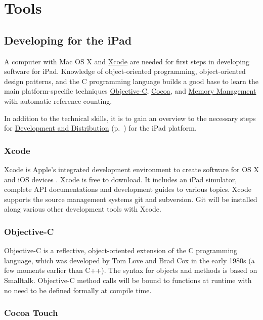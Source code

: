 

\section{Tools}

\subsection{Developing for the iPad}

A computer with Mac OS X and 
\href{sec:Xcode}{Xcode} are needed for first steps in developing software for iPad. 
Knowledge of object-oriented programming, object-oriented design patterns, 
and the C programming language 
builds a good base to learn the main platform-specific techniques 
\href{sec:ObjC}{Objective-C},
\href{sec:Cocoa}{Cocoa}, and
\href{sec:MemoryManagement}{Memory Management}
with automatic reference counting.

In addition to the technical skills, it is to gain an overview to the necessary steps for 
\href{sec:DAD}{Development and Distribution} (p.~\pageref{sec:DAD}) for the iPad platform.

\subsubsection{Xcode}
\label{sec:Xcode}

Xcode is Apple's integrated development environment to create software for OS X and iOS devices 
.
Xcode is free to download. It includes an iPad simulator, complete API documentations and development guides to various topics. Xcode supports the source management systems git and subversion. 
Git will be installed along various other development tools with Xcode.

\subsubsection{Objective-C}
\label{sec:ObjC}
Objective-C is a reflective, object-oriented extension of the C programming language,
 which was developed by Tom Love and Brad Cox in the early 1980s (a few moments earlier than C++). 
The syntax for objects and methods is based on Smalltalk. 
Objective-C method calls will be bound to functions at runtime with no need to be defined formally at compile time.

\subsubsection{Cocoa Touch}
\label{sec:Cocoa}

